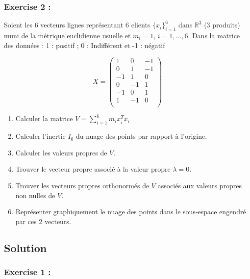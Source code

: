 \documentclass{article}
\begin{document}
\subsubsection*{Exercise 2 :}
Soient les 6 vecteurs lignes représentant 6 clients $\{x_i\}_{i=1}^6$ dans $\mathbb{R}^3$ (3 produits) muni de la métrique euclidienne usuelle et $m_i = 1$, $i = 1, \ldots, 6$. Dans la matrice des données : 1 : positif ; 0 : Indifférent et -1 : négatif

$$
X = 
\begin{pmatrix}
1 & 0 & -1 \\
0 & 1 & -1 \\
-1 & 1 & 0 \\
0 & -1 & 1 \\
-1 & 0 & 1 \\
1 & -1 & 0 \\
\end{pmatrix}
$$

\begin{enumerate}
    \item Calculer la matrice $V = \sum_{i=1}^{6} m_i x_i^T x_i$
    \item Calculer l’inertie $I_0$ du nuage des points par rapport à l’origine.
    \item Calculer les valeurs propres de $V$.
    \item Trouver le vecteur propre associé à la valeur propre $\lambda = 0$.
    \item Trouver les vecteurs propres orthonormés de $V$ associés aux valeurs propres non nulles de $V$.
    \item Représenter graphiquement le nuage des points dans le sous-espace engendré par ces 2 vecteurs.
\end{enumerate}





\subsection*{Solution}
\subsubsection*{Exercise 1 :}
\end{document}
